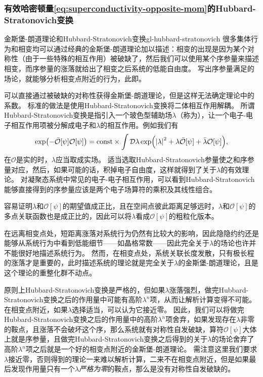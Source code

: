 \subsubsection{有效哈密顿量\eqref{eq:superconductivity-opposite-mom}的Hubbard-Stratonovich变换}

\begin{back}{金斯堡-朗道理论和Hubbard-Stratonovich变换}{gl-hubbard-stratonovich}
    很多集体行为和相变均可以通过经典的金斯堡-朗道理论加以描述：相变的出现是因为某个对称性（由于一些特殊的相互作用）被破缺了，然后我们可以使用某个序参量来描述相变，而序参量的涨落就给出了相变之后系统的低能自由度。
    写出序参量满足的场论，就能够分析相变点附近的行为，此即。

    可以直接通过被破缺的对称性获得金斯堡-朗道理论，但是这样无法确定理论中的系数。
    标准的做法是使用Hubbard-Stratonovich变换将二体相互作用解耦。
    所谓Hubbard-Stratonovich变换是指引入一个玻色型辅助场$\lambda$（称为），让一个电子-电子相互作用项被分解成电子和$\lambda$的相互作用。例如我们有
    \begin{equation}
        \exp(- \bar{\mathcal{O}}[\psi] \mathcal{O}[\psi] ) = \mathrm{const} \times 
        \int \mathcal{D} \lambda \exp(\abs{\lambda}^2 + \lambda \bar{\mathcal{O}}[\psi] + \bar{\lambda} \mathcal{O}[\psi]),
    \end{equation}
    在$\mathcal{O}$是实的时，$\lambda$应当取成实场。
    适当选取Hubbard-Stratonovich参量使之和序参量对应，然后，如果可能的话，积掉电子自由度，这样就得到了关于$\lambda$的有效理论。
    对凝聚态系统中常见的电子-电子相互作用，可以看到Hubbard-Stratonovich能够直接得到的序参量应该是两个电子场算符的乘积及其线性组合。
    
    容易证明$\lambda$和$\mathcal{O}[\psi]$的期望值成正比，且在空间点彼此距离足够远时，$\lambda$和$\mathcal{O}[\psi]$的多点关联函数也是成正比的，因此可以将$\lambda$看成$\mathcal{O}[\psi]$的粗粒化版本。

    在远离相变点处，短距离涨落对系统行为仍然有比较大的影响，因此隐隐约约还是能够从系统行为中看到低能细节——如晶格常数——因此完全关于$\lambda$的场论也许并不能很好地描述系统行为。
    然而，在相变点处，系统关联长度发散，只有极长程的涨落才是重要的，此时描述系统的理论就是完全关于$\lambda$的金斯堡-朗道理论，且是这个理论的重整化群不动点。

    原则上Hubbard-Stratonovich变换是严格的，但如果$\lambda$涨落强烈，做完Hubbard-Stratonovich变换之后的作用量中可能有高阶$\lambda^n$项，从而让解析计算变得不可能。
    在相变点附近，如果$\lambda$选择适当，可以认为它接近零。
    因此，我们可以将做完Hubbard-Stratonovich变换之后的作用量中的高阶$\lambda^n$项舍弃，如果发现存在$\lambda$非零的鞍点，且涨落不会破坏这个序，那么系统就有对称性自发破缺，算符$\mathcal{O}[\psi]$大体上就是序参量，且做完Hubbard-Stratonovich变换之后得到的关于$\lambda$的场论舍弃了高阶$\lambda^n$项之后就是一个好的相变点附近的金斯堡-朗道理论。
    需注意这里我们要求$\lambda$接近零，否则得到的理论一来难以解析计算，二来不在相变点附近，但是如果最后发现作用量只有一个$\lambda$\emph{严格为零}的鞍点，那么是没有对称性自发破缺的。


\end{back}
